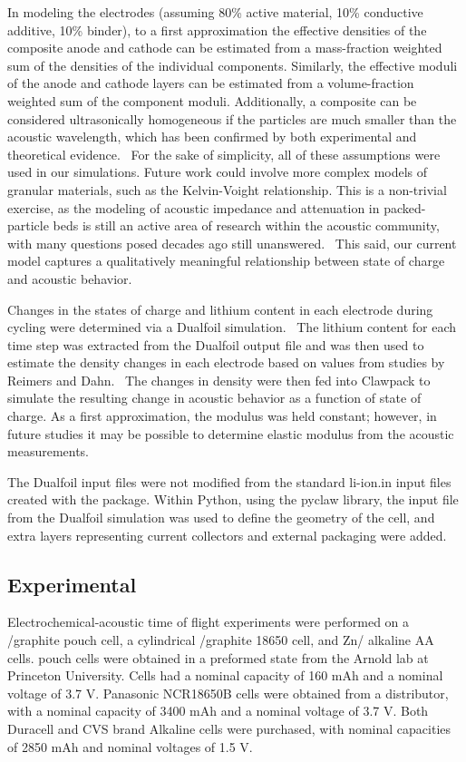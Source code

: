 In modeling the electrodes (assuming 80\% active material, 10\% conductive additive, 10\% binder), to a first approximation the effective densities of the composite anode and cathode can be estimated from a mass-fraction weighted sum of the densities of the individual components. Similarly, the effective moduli of the anode and cathode layers can be estimated from a volume-fraction weighted sum of the component moduli. Additionally, a composite can be considered ultrasonically homogeneous if the particles are much smaller than the acoustic wavelength, which has been confirmed by both experimental and theoretical evidence.~\cite{Schulitz1998-bq} For the sake of simplicity, all of these assumptions were used in our simulations. Future work could involve more  complex models of granular materials, such as the Kelvin-Voight relationship. This is a non-trivial exercise, as the modeling of acoustic impedance and attenuation in packed-particle beds is still an active area of research within the acoustic community, with many questions posed decades ago still unanswered.~\cite{Challis2005-vw, McClements1991-dj} This said, our current model captures a qualitatively meaningful relationship between state of charge and acoustic behavior.

Changes in the states of charge and lithium content in each electrode during cycling were determined via a Dualfoil simulation.~\cite{Albertus2007-eu} The lithium content for each time step was extracted from the Dualfoil output file and was then used to estimate the density changes in each electrode based on values from studies by Reimers and Dahn.~\cite{Reimers1992-ql} The changes in density were then fed into Clawpack to simulate the resulting change in acoustic behavior as a function of state of charge. As a first approximation, the modulus was held constant; however, in future studies it may be possible to determine elastic modulus from the acoustic measurements.

The Dualfoil input files were not modified from the standard li-ion.in input files created with the package. Within Python, using the pyclaw library, the input file from the Dualfoil simulation was used to define the geometry of the cell, and extra layers representing current collectors and external packaging were added.

\subsection{Experimental}

Electrochemical-acoustic time of flight experiments were performed on a /graphite pouch cell, a cylindrical /graphite 18650 cell, and Zn/ alkaline AA cells.  pouch cells were obtained in a preformed state from the Arnold lab at Princeton University. Cells had a nominal capacity of 160 mAh and a nominal voltage of 3.7 V. Panasonic NCR18650B  cells were obtained from a distributor, with a nominal capacity of 3400 mAh and a nominal voltage of 3.7 V. Both Duracell and CVS brand Alkaline cells were purchased, with nominal capacities of 2850 mAh and nominal voltages of 1.5 V.

